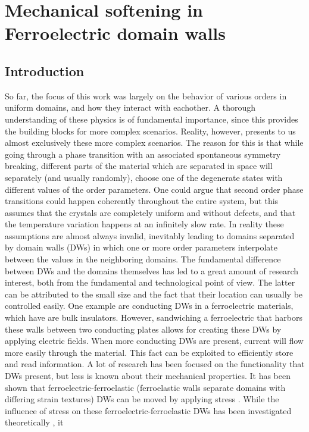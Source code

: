 \chapter{Mechanical softening in Ferroelectric domain walls}


\section{Introduction}
So far, the focus of this work was largely on the behavior of various orders in uniform domains, and how they interact with eachother.
A thorough understanding of these physics is of fundamental importance, since this provides the building blocks for more complex scenarios.
Reality, however, presents to us almost exclusively these more complex scenarios.
The reason for this is that while going through a phase transition with an associated spontaneous symmetry breaking, different parts of the material which are separated in space will separately (and usually randomly), choose one of the degenerate states with different values of the order parameters.
One could argue that second order phase transitions could happen coherently throughout the entire system, but this assumes that the crystals are completely uniform and without defects, and that the temperature variation happens at an infinitely slow rate.
In reality these assumptions are almost always invalid, inevitably leading to domains separated by domain walls (DWs) in which one or more order parameters interpolate between the values in the neighboring domains.
The fundamental difference between DWs and the domains themselves has led to a great amount of research interest, both from the fundamental and technological point of view.
The latter can be attributed to the small size and the fact that their location can usually be controlled easily.
One example are conducting DWs in a ferroelectric materials, which have are bulk insulators.
However, sandwiching a ferroelectric that harbors these walls between two conducting plates allows for creating these DWs by applying electric fields.
When more conducting DWs are present, current will flow more easily through the material.
This fact can be exploited to efficiently store and read information.
A lot of research has been focused on the functionality that DWs present, but less is known about their mechanical properties.
It has been shown that ferroelectric-ferroelastic (ferroelastic walls separate domains with differing strain textures) DWs can be moved by applying stress \cite{Schneider2001}.
While the influence of stress on these ferroelectric-ferroelastic DWs has been investigated theoretically \cite{Lee2003}, it 

